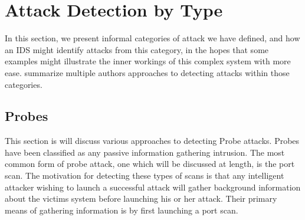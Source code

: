 \documentclass{acm_proc_article-sp}
\begin{document}
\section{Attack Detection by Type}
    In this section, we present informal categories of attack we have defined, and how an IDS might identify attacks from this category, in the hopes that some examples might illustrate the inner workings of this complex system with more ease. summarize multiple authors approaches to detecting attacks within those categories.
    
    \subsection{Probes}
	 This section is will discuss various approaches to detecting Probe attacks. Probes have been classified as any passive information gathering intrusion. The most common form of probe attack, one which will be discussed at length, is the port scan. The motivation for detecting these types of scans is that any intelligent attacker wishing to launch a successful attack will gather background information about the victims system before launching his or her attack. Their primary means of gathering information is by first launching a port scan.
	 
\end{document}
